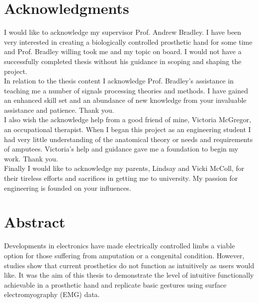 \documentclass[12pt,openany,a4paper]{book}
\begin{document}
\cleardoublepage
\setlength{\parindent}{0cm}
\chapter{Acknowledgments}

I would like to acknowledge my supervisor Prof. Andrew Bradley. I have been very interested in creating a biologically controlled prosthetic hand for some time and Prof. Bradley willing took me and my topic on board. I would not have a successfully completed thesis without his guidance in scoping and shaping the project.\\

In relation to the thesis content I acknowledge Prof. Bradley's assistance in teaching me a number of signals processing theories and methods. I have gained an enhanced skill set and an abundance of new knowledge from your invaluable assistance and patience. Thank you. \\

I also wish the acknowledge help from a good friend of mine, Victoria McGregor, an occupational therapist. When I began this project as an engineering student I had very little understanding of the anatomical theory or needs and requirements of amputees. Victoria's help and guidance gave me a foundation to begin my work. Thank you. \\

Finally I would like to acknowledge my parents, Lindsay and Vicki McColl, for their tireless efforts and sacrifices in getting me to university. My passion for engineering is founded on your influences.\\

\cleardoublepage

\chapter{Abstract}


Developments in electronics have made electrically controlled limbs a viable option for those suffering from amputation or a congenital condition. However, studies show that current prosthetics do not function as intuitively as users would like. It was the aim of this thesis to demonstrate the level of intuitive functionally achievable in a prosthetic hand and replicate basic gestures using surface electromyography (EMG) data. \\
\end{document}
